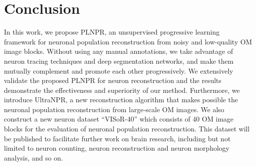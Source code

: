 \documentclass[journal]{IEEEtran}
\begin{document}
%







\section{Conclusion}
\label{sec:conclusion}

In this work, we propose PLNPR, an unsupervised progressive learning framework for neuronal population reconstruction from noisy and low-quality OM image blocks.
Without using any manual annotations, we take advantage of neuron tracing techniques and deep segmentation networks, and make them mutually complement and promote each other progressively.
We extensively validate the proposed PLNPR for neuron reconstruction and the results demonstrate the effectiveness and superiority of our method.
Furthermore, we introduce UltraNPR, a new reconstruction algorithm that makes possible the neuronal population reconstruction from large-scale OM images.
We also construct a new neuron dataset ``VISoR-40'' which consists of $ 40 $ OM image blocks for the evaluation of neuronal population reconstruction.
This dataset will be published to facilitate further work on brain research, including but not limited to neuron counting, neuron reconstruction and neuron morphology analysis, and so on.

\end{document}
